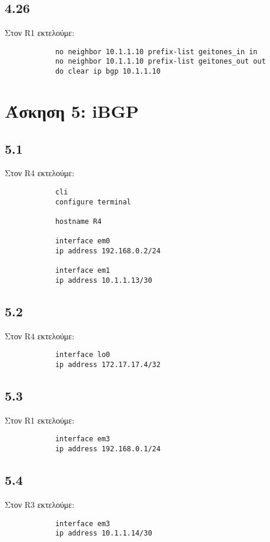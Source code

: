 \documentclass[a4paper, 12pt]{article}
\begin{document}
	\subsection*{4.26}
		Στον R1 εκτελούμε:
		
		\begin{verbatim}
			no neighbor 10.1.1.10 prefix-list geitones_in in
			no neighbor 10.1.1.10 prefix-list geitones_out out
			do clear ip bgp 10.1.1.10
		\end{verbatim}

\section*{Άσκηση 5: iBGP}

	\subsection*{5.1}
		Στον R4 εκτελούμε:
		
		\begin{verbatim}
			cli
			configure terminal
			
			hostname R4
			
			interface em0
			ip address 192.168.0.2/24
			
			interface em1
			ip address 10.1.1.13/30
		\end{verbatim}

	\subsection*{5.2}
		Στον R4 εκτελούμε:
		
		\begin{verbatim}
			interface lo0
			ip address 172.17.17.4/32
		\end{verbatim}

	\subsection*{5.3}
		Στον R1 εκτελούμε:
		
		\begin{verbatim}
			interface em3
			ip address 192.168.0.1/24
		\end{verbatim}

	\subsection*{5.4}
		Στον R3 εκτελούμε:
		
		\begin{verbatim}
			interface em3
			ip address 10.1.1.14/30
		\end{verbatim}
\end{document}
